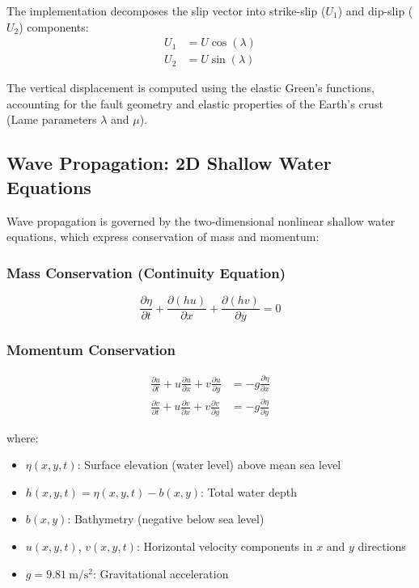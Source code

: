 \documentclass[12pt]{article}
\begin{document}
The implementation decomposes the slip vector into strike-slip ($U_1$) and dip-slip ($U_2$) components:
\begin{align}
U_1 &= U \cos(\lambda) \\
U_2 &= U \sin(\lambda)
\end{align}

The vertical displacement is computed using the elastic Green's functions, accounting for the fault geometry and elastic properties of the Earth's crust (Lame parameters $\lambda$ and $\mu$).

\subsection{Wave Propagation: 2D Shallow Water Equations}

Wave propagation is governed by the two-dimensional nonlinear shallow water equations, which express conservation of mass and momentum:

\subsubsection{Mass Conservation (Continuity Equation)}
\begin{equation}
\frac{\partial \eta}{\partial t} + \frac{\partial (hu)}{\partial x} + \frac{\partial (hv)}{\partial y} = 0
\end{equation}

\subsubsection{Momentum Conservation}
\begin{align}
\frac{\partial u}{\partial t} + u\frac{\partial u}{\partial x} + v\frac{\partial u}{\partial y} &= -g\frac{\partial \eta}{\partial x} \\
\frac{\partial v}{\partial t} + u\frac{\partial v}{\partial x} + v\frac{\partial v}{\partial y} &= -g\frac{\partial \eta}{\partial y}
\end{align}

where:
\begin{itemize}
    \item $\eta(x, y, t)$: Surface elevation (water level) above mean sea level
    \item $h(x, y, t) = \eta(x, y, t) - b(x, y)$: Total water depth
    \item $b(x, y)$: Bathymetry (negative below sea level)
    \item $u(x, y, t)$, $v(x, y, t)$: Horizontal velocity components in $x$ and $y$ directions
    \item $g = \SI{9.81}{\meter\per\second\squared}$: Gravitational acceleration
\end{itemize}
\end{document}
